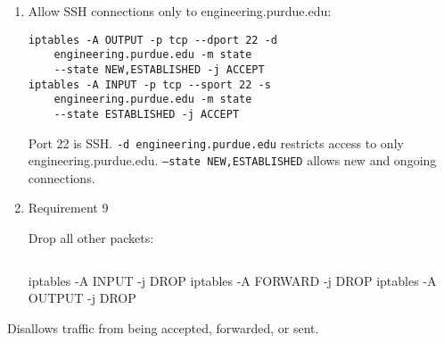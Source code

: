 \documentclass{article}
\begin{document}
\begin{enumerate}
\item Allow SSH connections only to engineering.purdue.edu:

\begin{lstlisting}[basicstyle=\ttfamily,frame=single]
iptables -A OUTPUT -p tcp --dport 22 -d 
	engineering.purdue.edu -m state
	--state NEW,ESTABLISHED -j ACCEPT
iptables -A INPUT -p tcp --sport 22 -s 
	engineering.purdue.edu -m state
	--state ESTABLISHED -j ACCEPT
\end{lstlisting}

\noindent
Port 22 is SSH. \texttt{-d engineering.purdue.edu} restricts access to only engineering.purdue.edu. \texttt{--state NEW,ESTABLISHED} allows new and ongoing connections.

\item Requirement 9

\noindent
Drop all other packets:

\begin{lstlisting}[basicstyle=\ttfamily,frame=single]

\end{lstlisting}
iptables -A INPUT -j DROP
iptables -A FORWARD -j DROP
iptables -A OUTPUT -j DROP
\end{enumerate}

\noindent
Disallows traffic from being accepted, forwarded, or sent.
\end{document}
